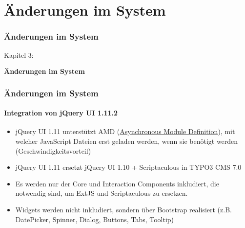 %

\section{Änderungen im System}
\begin{frame}[fragile]
	\frametitle{Änderungen im System}

	\begin{center}\huge{Kapitel 3:}\end{center}
	\begin{center}\huge{\color{typo3darkgrey}\textbf{Änderungen im System}}\end{center}

\end{frame}


\begin{frame}[fragile]
	\frametitle{Änderungen im System}
	\framesubtitle{Integration von jQuery UI 1.11.2}

	\begin{itemize}
		\item jQuery UI 1.11 unterstützt AMD
			(\href{http://en.wikipedia.org/wiki/Asynchronous_module_definition}{Asynchronous Module Definition}),
			mit welcher JavaScript Dateien erst geladen werden, wenn sie benötigt werden (Geschwindigkeitsvorteil)

    	\item jQuery UI 1.11 ersetzt jQuery UI 1.10 + Scriptaculous in TYPO3 CMS 7.0

    	\item Es werden nur der Core und Interaction Components inkludiert,
    		die notwendig sind, um ExtJS und Scriptaculous zu ersetzen.

    	\item Widgets werden nicht inkludiert, sondern über Bootstrap realisiert\newline
    		(z.B. DatePicker, Spinner, Dialog, Buttons, Tabs, Tooltip)

	\end{itemize}

\end{frame}

